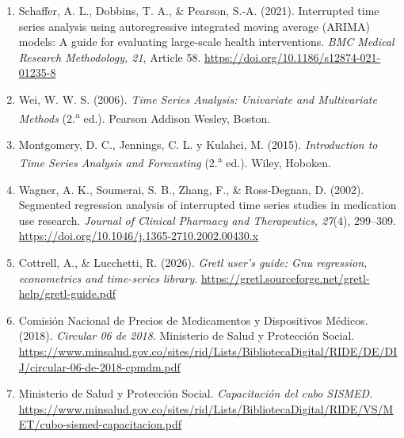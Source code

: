 \documentclass[10pt,twoside,xcolor=table,x11anmes]{IEEEtran}
\begin{document}
\begin{enumerate}
  \item Schaffer, A. L., Dobbins, T. A., \& Pearson, S.-A. (2021). Interrupted time series analysis using autoregressive integrated moving average (ARIMA) models: A guide for evaluating large-scale health interventions. \textit{BMC Medical Research Methodology, 21}, Article 58. \url{https://doi.org/10.1186/s12874-021-01235-8}


  \item Wei, W. W. S. (2006). \textit{Time Series Analysis: Univariate and Multivariate Methods} (2.\textsuperscript{a} ed.). Pearson Addison Wesley, Boston.

  \item Montgomery, D. C., Jennings, C. L. y Kulahci, M. (2015). \textit{Introduction to Time Series Analysis and Forecasting} (2.\textsuperscript{a} ed.). Wiley, Hoboken.


  \item Wagner, A. K., Soumerai, S. B., Zhang, F., \& Ross-Degnan, D. (2002). Segmented regression analysis of interrupted time series studies in medication use research. \textit{Journal of Clinical Pharmacy and Therapeutics, 27}(4), 299--309. \url{https://doi.org/10.1046/j.1365-2710.2002.00430.x}

   \item Cottrell, A., \& Lucchetti, R. (2026). \textit{Gretl user's guide: Gnu regression, econometrics and time-series library}. \url{https://gretl.sourceforge.net/gretl-help/gretl-guide.pdf}

   \item Comisión Nacional de Precios de Medicamentos y Dispositivos Médicos. (2018). \textit{Circular 06 de 2018}. Ministerio de Salud y Protección Social. \url{https://www.minsalud.gov.co/sites/rid/Lists/BibliotecaDigital/RIDE/DE/DIJ/circular-06-de-2018-cpmdm.pdf}



  \item Ministerio de Salud y Protección Social. \textit{Capacitación del cubo SISMED}. \url{https://www.minsalud.gov.co/sites/rid/Lists/BibliotecaDigital/RIDE/VS/MET/cubo-sismed-capacitacion.pdf}


\end{enumerate}
\end{document}
